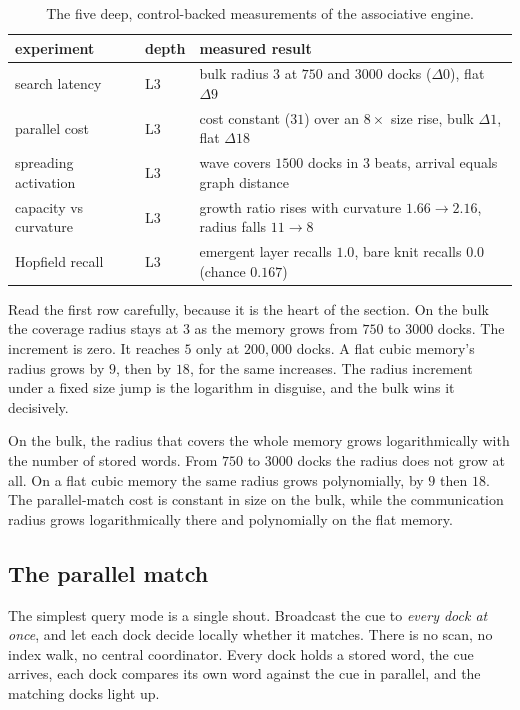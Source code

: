 \begin{table}[ht]
\centering
\begin{tabular}{@{}lll@{}}
\toprule
experiment & depth & measured result \\
\midrule
search latency & L3 & bulk radius $3$ at $750$ and $3000$ docks ($\Delta 0$), flat $\Delta 9$ \\
parallel cost & L3 & cost constant ($31$) over an $8\times$ size rise, bulk $\Delta 1$, flat $\Delta 18$ \\
spreading activation & L3 & wave covers $1500$ docks in $3$ beats, arrival equals graph distance \\
capacity vs curvature & L3 & growth ratio rises with curvature $1.66 \to 2.16$, radius falls $11 \to 8$ \\
Hopfield recall & L3 & emergent layer recalls $1.0$, bare knit recalls $0.0$ (chance $0.167$) \\
\bottomrule
\end{tabular}
\caption{The five deep, control-backed measurements of the associative engine.}
\label{tab:associative-deep}
\end{table}

Read the first row carefully, because it is the heart of the section. On the bulk the coverage radius stays at $3$ as the memory grows from $750$ to $3000$ docks. The increment is zero. It reaches $5$ only at $200{,}000$ docks. A flat cubic memory's radius grows by $9$, then by $18$, for the same increases. The radius increment under a fixed size jump is the logarithm in disguise, and the bulk wins it decisively.

\begin{result}
On the bulk, the radius that covers the whole memory grows logarithmically with the number of stored words. From $750$ to $3000$ docks the radius does not grow at all. On a flat cubic memory the same radius grows polynomially, by $9$ then $18$. The parallel-match cost is constant in size on the bulk, while the communication radius grows logarithmically there and polynomially on the flat memory.
\end{result}

\subsection{The parallel match}

The simplest query mode is a single shout. Broadcast the cue to \emph{every dock at once}, and let each dock decide locally whether it matches. There is no scan, no index walk, no central coordinator. Every dock holds a stored word, the cue arrives, each dock compares its own word against the cue in parallel, and the matching docks light up.

